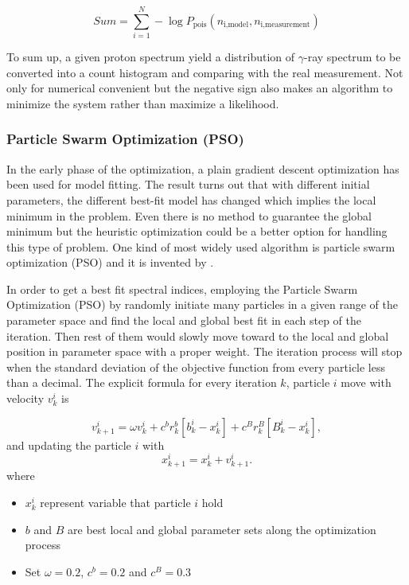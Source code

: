 \begin{equation}
    Sum = \sum_{i=1}^{N} -\log P_{\text{pois}}(n_{\text{i,model}}, n_{\text{i,measurement}})
    \label{eq:loglikelihood}
\end{equation}

To sum up, a given proton spectrum yield a distribution of $\gamma$-ray
spectrum to be converted into a count histogram and comparing with the 
real measurement. Not only for numerical convenient but the negative sign 
also makes an algorithm to minimize the system rather than maximize 
a likelihood.

\subsubsection{Particle Swarm Optimization (PSO)}

In the early phase of the optimization, a plain gradient descent 
optimization has been used for model fitting. The result turns out 
that with different initial parameters, the different best-fit model 
has changed which implies the local minimum in the problem. 
Even there is no method to guarantee the global minimum but the heuristic
optimization could be a better option for handling this type of problem.
One kind of most widely used algorithm is particle swarm
optimization (PSO) and it is invented by \cite{pso_optimize}.

In order to get a best fit spectral indices, employing the Particle Swarm Optimization (PSO)
by randomly initiate many particles in a given range of the parameter space and find the
local and global best fit in each step of the iteration. Then rest of them would slowly move
toward to the local and global position in parameter space with a proper weight. 
The iteration process will stop when the standard deviation of the objective function from 
every particle less than a decimal. The explicit formula for every iteration $k$,
particle $i$ move with velocity $v_k^i$ is

\begin{equation}
    v^i_{k+1} = \omega v^i_k + c^br^b_k[b^i_k-x^i_k] + c^Br^B_k[B^i_k-x^i_k],
    \label{eq:pso}
\end{equation}
and updating the particle $i$ with
\begin{equation}
    x^i_{k+1} = x^i_k + v^i_{k+1}.
    \label{eq:pso_update}
\end{equation}
where
\begin{itemize}
    \item $x^i_k$ represent variable that particle $i$ hold
    \item $b$ and $B$ are best local and global parameter sets along the optimization process
    \item Set $\omega = 0.2$, $c^b = 0.2$ and $c^B = 0.3$
\end{itemize}

